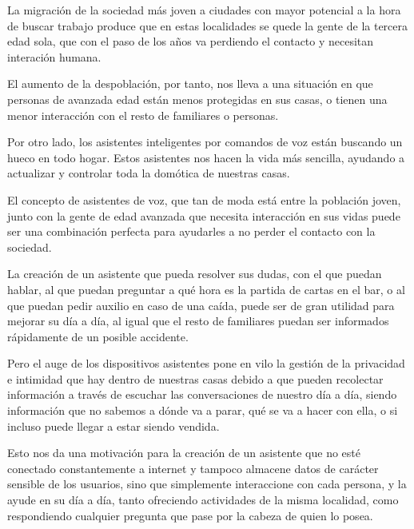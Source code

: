 La migración de la sociedad más joven a ciudades con mayor potencial a la hora de buscar trabajo produce que en estas localidades se quede la gente de la tercera edad sola, que con el paso de los años va perdiendo el contacto y necesitan interación humana.

El aumento de la despoblación, por tanto, nos lleva a una situación en que personas de avanzada edad están menos protegidas en sus casas, o tienen una menor interacción con el resto de familiares o personas.

Por otro lado, los asistentes inteligentes por comandos de voz están buscando un hueco en todo hogar. Estos asistentes nos hacen la vida más sencilla, ayudando a actualizar y controlar toda la domótica de nuestras casas.

El concepto de asistentes de voz, que tan de moda está entre la población joven, junto con la gente de edad avanzada que necesita interacción en sus vidas puede ser una combinación perfecta para ayudarles a no perder el contacto con la sociedad.

La creación de un asistente que pueda resolver sus dudas, con el que puedan hablar, al que puedan preguntar a qué hora es la partida de cartas en el bar, o al que puedan pedir auxilio en caso de una caída, puede ser de gran utilidad para mejorar su día a día, al igual que el resto de familiares puedan ser informados rápidamente de un posible accidente.

Pero el auge de los dispositivos asistentes pone en vilo la gestión de la privacidad e intimidad que hay dentro de nuestras casas debido a que pueden recolectar información a través de escuchar las conversaciones de nuestro día a día, siendo información que no sabemos a dónde va a parar, qué se va a hacer con ella, o si incluso puede llegar a estar siendo vendida.

Esto nos da una motivación para la creación de un asistente que no esté conectado constantemente a internet y tampoco almacene datos de carácter sensible de los usuarios, sino que simplemente interaccione con cada persona, y la ayude en su día a día, tanto ofreciendo actividades de la misma localidad, como respondiendo cualquier pregunta que pase por la cabeza de quien lo posea.

